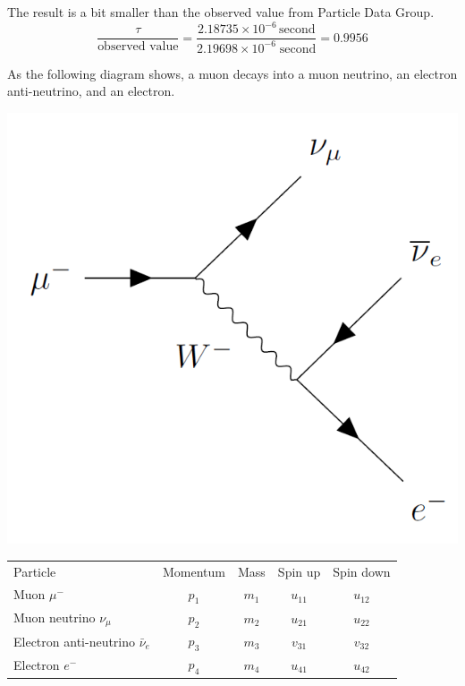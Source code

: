 The result is a bit smaller than the observed value from Particle Data Group.
\begin{equation*}
\frac{\tau}{\text{observed value}}
=\frac{2.18735\times10^{-6}\,\text{second}}{2.19698\times10^{-6}\;\text{second}}=0.9956
\end{equation*}

As the following diagram shows, a muon decays into a muon neutrino, an electron anti-neutrino,
and an electron.
\begin{center}
\includegraphics[scale=0.25]{muon-decay-diagram.png}
\end{center}

\begin{center}
\begin{tabular}{lcccc}
Particle & Momentum & Mass & Spin up & Spin down
\\[2ex]
Muon $\mu^-$ & $p_1$ & $m_1$ & $u_{11}$ & $u_{12}$
\\
Muon neutrino $\nu_\mu$ & $p_2$ & $m_2$ & $u_{21}$ & $u_{22}$
\\
Electron anti-neutrino $\bar{\nu}_e$ & $p_3$ & $m_3$ & $v_{31}$ & $v_{32}$
\\
Electron $e^-$ & $p_4$ & $m_4$ & $u_{41}$ & $u_{42}$
\end{tabular}
\end{center}


